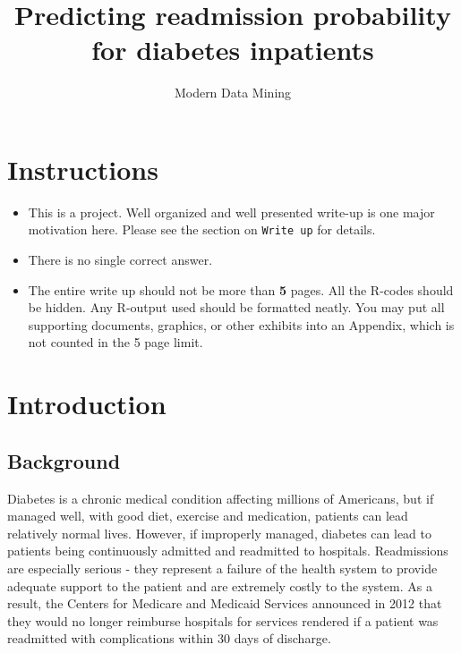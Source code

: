 \documentclass[
]{article}
\title{Predicting readmission probability for diabetes inpatients}
\author{Modern Data Mining}
\date{}
\providecommand{\tightlist}{%
  \setlength{\itemsep}{0pt}\setlength{\parskip}{0pt}}
\begin{document}
\maketitle

{
\hypersetup{linkcolor=}
\setcounter{tocdepth}{4}
\tableofcontents
}
\hypertarget{instructions}{%
\section{Instructions}\label{instructions}}

\begin{itemize}
\tightlist
\item
  This is a project. Well organized and well presented write-up is one
  major motivation here. Please see the section on \texttt{Write\ up}
  for details.
\item
  There is no single correct answer.\\
\item
  The entire write up should not be more than \textbf{5} pages. All the
  R-codes should be hidden. Any R-output used should be formatted
  neatly. You may put all supporting documents, graphics, or other
  exhibits into an Appendix, which is not counted in the 5 page limit.
\end{itemize}

\hypertarget{introduction}{%
\section{Introduction}\label{introduction}}

\hypertarget{background}{%
\subsection{Background}\label{background}}

Diabetes is a chronic medical condition affecting millions of Americans,
but if managed well, with good diet, exercise and medication, patients
can lead relatively normal lives. However, if improperly managed,
diabetes can lead to patients being continuously admitted and readmitted
to hospitals. Readmissions are especially serious - they represent a
failure of the health system to provide adequate support to the patient
and are extremely costly to the system. As a result, the Centers for
Medicare and Medicaid Services announced in 2012 that they would no
longer reimburse hospitals for services rendered if a patient was
readmitted with complications within 30 days of discharge.
\end{document}
